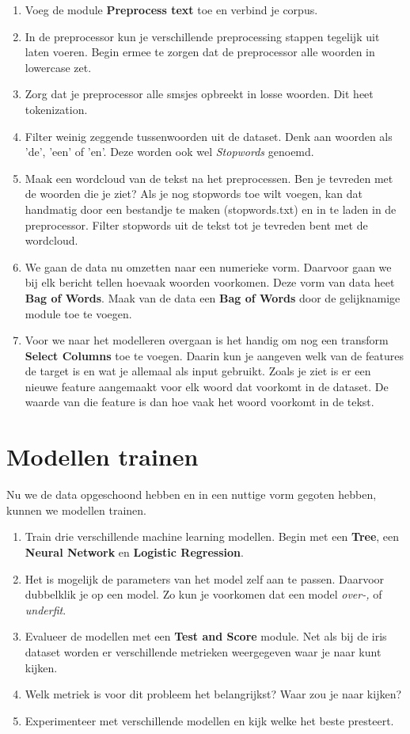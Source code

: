 \documentclass{article}
\newcommand{\tb}[1]{\textbf{#1}}
\begin{document}
\begin{enumerate}
\item Voeg de module \tb{Preprocess text} toe en verbind je corpus.
\item In de preprocessor kun je verschillende preprocessing stappen tegelijk uit laten voeren. Begin ermee te zorgen dat de preprocessor alle woorden in lowercase zet.
\item Zorg dat je preprocessor alle smsjes opbreekt in losse woorden. Dit heet tokenization.
\item Filter weinig zeggende tussenwoorden uit de dataset. Denk aan woorden als 'de', 'een' of 'en'. Deze worden ook wel \textit{Stopwords} genoemd.
\item Maak een wordcloud van de tekst na het preprocessen. Ben je tevreden met de woorden die je ziet? Als je nog stopwords toe wilt voegen, kan dat handmatig door een bestandje te maken (stopwords.txt) en in te laden in de preprocessor. Filter stopwords uit de tekst tot je tevreden bent met de wordcloud.
\item We gaan de data nu omzetten naar een numerieke vorm. Daarvoor gaan we bij elk bericht tellen hoevaak woorden voorkomen. Deze vorm van data heet \tb{Bag of Words}. Maak van de data een \tb{Bag of Words} door de gelijknamige module toe te voegen.
\item Voor we naar het modelleren overgaan is het handig om nog een transform \tb{Select Columns} toe te voegen. Daarin kun je aangeven welk van de features de target is en wat je allemaal als input gebruikt. Zoals je ziet is er een nieuwe feature aangemaakt voor elk woord dat voorkomt in de dataset. De waarde van die feature is dan hoe vaak het woord voorkomt in de tekst.
\end{enumerate}

\section*{Modellen trainen}
Nu we de data opgeschoond hebben en in een nuttige vorm gegoten hebben, kunnen we modellen trainen.

\begin{enumerate}
\item Train drie verschillende machine learning modellen. Begin met een \tb{Tree}, een \tb{Neural Network} en \tb{Logistic Regression}.
\item Het is mogelijk de parameters van het model zelf aan te passen. Daarvoor dubbelklik je op een model. Zo kun je voorkomen dat een model \textit{over-,} of \textit{underfit}. 
\item Evalueer de modellen met een \tb{Test and Score} module. Net als bij de iris dataset worden er verschillende metrieken weergegeven waar je naar kunt kijken.
\item Welk metriek is voor dit probleem het belangrijkst? Waar zou je naar kijken?
\item Experimenteer met verschillende modellen en kijk welke het beste presteert.
\end{enumerate}
\end{document}
